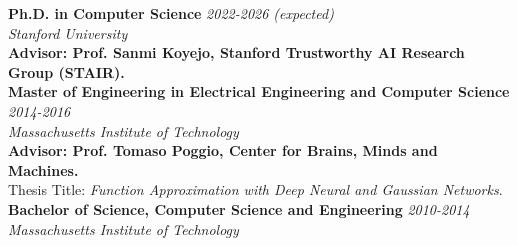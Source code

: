 \documentclass{article}
\newenvironment{changemargin}[2]{%
  \begin{list}{}{%
    \setlength{\topsep}{0pt}%
    \setlength{\leftmargin}{#1}%
    \setlength{\rightmargin}{#2}%
    \setlength{\listparindent}{\parindent}%
    \setlength{\itemindent}{\parindent}%
    \setlength{\parsep}{\parskip}%
  }%
  \item[]}{\end{list}
}
\newenvironment{body} {
		\vspace*{-16pt}
		\begin{changemargin}{-0.25in}{-0.5in}
	  }
		{\end{changemargin}\vspace{8pt plus 12pt}
	}
\begin{document}
\begin{body}
	\vspace{12pt}
	\textbf{Ph.D. in Computer Science} \hfill \emph{2022-2026 (expected)}\\
	\emph{Stanford University} \hfill {}\\
	\textbf{Advisor: Prof. Sanmi Koyejo, Stanford Trustworthy AI Research Group (STAIR).}\\

	\smallskip
	\textbf{Master of Engineering in Electrical Engineering and Computer Science} \hfill \emph{2014-2016}\\
	\emph{Massachusetts Institute of Technology} \hfill {}\\
	\textbf{Advisor: Prof. Tomaso Poggio, Center for Brains, Minds and Machines.}\\
	Thesis Title: \emph{Function Approximation with Deep Neural and Gaussian Networks}.\\

	\smallskip
	\textbf{Bachelor of Science, Computer Science and Engineering} \hfill \emph{2010-2014}\\
	\emph{Massachusetts Institute of Technology} \hfill {}\\
\end{body}
\end{document}
